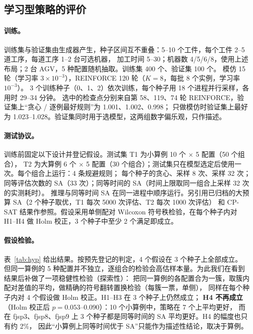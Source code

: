 \documentclass[11pt,a4paper]{ctexart}
\theoremstyle{definition}
\theoremstyle{remark}
\begin{document}
\subsection{学习型策略的评价}\label{sec:l2}

\paragraph{训练。}训练集与验证集由生成器产生，种子区间互不重叠：5--10 个工件，每个工件 2--5 道工序，每道工序 1--2 台可选机器，
加工时间 5--30；机器数 4/5/6/8，使用上述布局；2 台 AGV，5 种配置随机抽取。训练集 400 个、验证集 100 个。
模仿 15 轮（学习率 $3\times10^{-3}$），REINFORCE 120 轮（$K=8$，每批 8 个实例，学习率 $10^{-3}$）。
3 个训练种子（0、1、2）依次训练，每个种子用 18 个进程并行采样，各用时 29--34 分钟。
选中的检查点分别来自第 58、119、74 轮 REINFORCE，验证集上“贪心 / 逐例最好规则”为 1.001、1.002、0.998；
只做模仿时验证集上最好为 1.023--1.028。验证集同时用于选模型，这两组数字偏乐观，只作描述。

\paragraph{测试协议。}训练前固定以下设计并登记假设。测试集 T1 为小算例 10 个 × 5 配置（50 个组合），
T2 为大算例 6 个 × 5 配置（30 个组合）；测试集只在模型选定后使用一次。每个组合上运行：4 条规避规则；
每个种子的贪心、采样 8 次、采样 32 次；同等评估次数的 SA（33 次）；同等时间的 SA（时间上限取同一组合上采样 32 次的实测耗时）。
推理与同等时间 SA 在同一进程中顺序运行。另引用已归档的大预算 SA（2 个种子取优，T1 每次 5000 次评估、T2 每次 1000 次评估）
和 CP-SAT 结果作参照。假设采用单侧配对 Wilcoxon 符号秩检验，在每个种子内对 H1--H4 做 Holm 校正，3 个种子中至少 2 个满足即成立。

\paragraph{假设检验。}表~\ref{tab:hyp} 给出结果。按预先登记的判定，4 个假设在 3 个种子上全部成立。
但同一算例的 5 种配置并不独立，逐组合的检验会高估样本量。为此我们在看到结果后补做了一项稳健性检验（探索性）：
把同一算例的各配置合为一簇，取簇内配对差值的平均，做精确的符号翻转置换检验（每簇一票，单侧），
同样在每个种子内对 4 个假设做 Holm 校正。H1--H3 在 3 个种子上仍然成立；
\textbf{H4 不再成立}（Holm 校正后 $p = 0.053$--$0.090$）：10 个小算例中，策略在 7 个上平均更好，
而在 fjsp3、fjsp8、fjsp9 上 3 个种子都是同等时间的 SA 平均更好。H4 的幅度也只有约 2\%，
因此“小算例上同等时间优于 SA”只能作为描述性结论，取决于算例。
\end{document}
